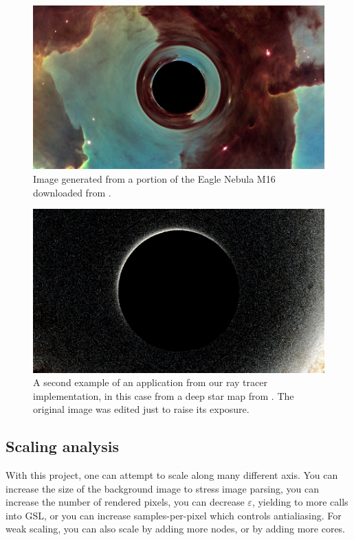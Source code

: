 \begin{figure}[h]
  \centering
  \includegraphics[width=0.8\linewidth]{figs/eagle_render}
  \caption{Image generated from a portion of the Eagle Nebula M16 downloaded from \cite{esa-pillars}.}
  \label{fig:eagle}
\end{figure}


\begin{figure}[h]
  \centering
  \includegraphics[width=0.8\linewidth]{figs/starry_render}
  \caption{A second example of an application from our ray tracer implementation,
	in this case from a deep star map from \cite{deepstarmap-nasa_svs}.
	The original image was edited just to raise its exposure.}
  \label{fig:starry}
\end{figure}




\subsection{Scaling analysis}

With this project, one can attempt to scale along many different axis. You can increase the size of the background image to stress image parsing, you can increase the number of rendered pixels, you can decrease $\varepsilon$, yielding to more calls into GSL, or you can increase samples-per-pixel which controls antialiasing. For weak scaling, you can also scale by adding more nodes, or by adding more cores. 

